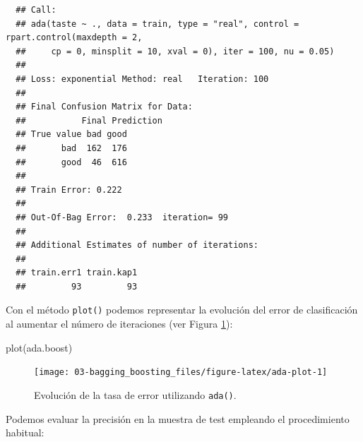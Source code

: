 \documentclass[
]{book}
\newenvironment{Shaded}{\begin{snugshade}}{\end{snugshade}}
\newcommand{\AttributeTok}[1]{\textcolor[rgb]{0.77,0.63,0.00}{#1}}
\newcommand{\FunctionTok}[1]{\textcolor[rgb]{0.00,0.00,0.00}{#1}}
\newcommand{\NormalTok}[1]{#1}
\newcommand{\OtherTok}[1]{\textcolor[rgb]{0.56,0.35,0.01}{#1}}
\newcommand{\SpecialCharTok}[1]{\textcolor[rgb]{0.00,0.00,0.00}{#1}}
\newcommand{\StringTok}[1]{\textcolor[rgb]{0.31,0.60,0.02}{#1}}
\theoremstyle{break}
\theoremstyle{nonumberplain}
\begin{document}
\begin{verbatim}
  ## Call:
  ## ada(taste ~ ., data = train, type = "real", control = rpart.control(maxdepth = 2, 
  ##     cp = 0, minsplit = 10, xval = 0), iter = 100, nu = 0.05)
  ## 
  ## Loss: exponential Method: real   Iteration: 100 
  ## 
  ## Final Confusion Matrix for Data:
  ##           Final Prediction
  ## True value bad good
  ##       bad  162  176
  ##       good  46  616
  ## 
  ## Train Error: 0.222 
  ## 
  ## Out-Of-Bag Error:  0.233  iteration= 99 
  ## 
  ## Additional Estimates of number of iterations:
  ## 
  ## train.err1 train.kap1 
  ##         93         93
\end{verbatim}

Con el método \texttt{plot()} podemos representar la evolución del error de clasificación al aumentar el número de iteraciones (ver Figura \ref{fig:ada-plot}):



\begin{Shaded}
\begin{Highlighting}[]
\FunctionTok{plot}\NormalTok{(ada.boost)}
\end{Highlighting}
\end{Shaded}

\begin{figure}[!htb]

{\centering \texttt{[image: 03-bagging\_boosting\_files/figure-latex/ada-plot-1]} 

}

\caption{Evolución de la tasa de error utilizando \texttt{ada()}.}\label{fig:ada-plot}
\end{figure}

Podemos evaluar la precisión en la muestra de test empleando el procedimiento habitual:

\begin{Shaded}
\end{Shaded}
\end{document}
